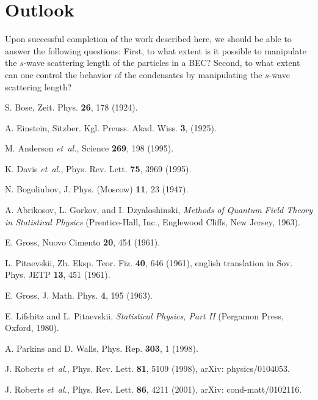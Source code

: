 \documentclass[%
   final       %
]{prospectus}
\begin{document}
\section*{Outlook}

Upon successful completion of the work described here, we
should be able to answer the following questions: First, to what extent is it
possible to manipulate the $s$-wave scattering length of the particles in a
BEC? Second, to what extent can one control the behavior of the condensates 
by manipulating the $s$-wave scattering length?

\begin{thebibliography}{10}

S. Bose, Zeit. Phys. {\bf 26},  178  (1924).

A. Einstein, Sitzber. Kgl. Preuss. Akad. Wiss. {\bf 3},    (1925).

M. Anderson {\it et~al.}, Science {\bf 269},  198  (1995).

K. Davis {\it et~al.}, Phys. Rev. Lett. {\bf 75},  3969  (1995).

N. Bogoliubov, J. Phys. (Moscow) {\bf 11},  23  (1947).

A. Abrikosov, L. Gorkov, and I. Dzyaloshinski, {\em Methods of Quantum Field
  Theory in Statistical Physics} (Prentice-Hall, Inc., Englewood Cliffs, New
  Jersey, 1963).

E. Gross, Nuovo Cimento {\bf 20},  454  (1961).

L. Pitaevskii, Zh. Eksp. Teor. Fiz. {\bf 40},  646  (1961), english translation
  in Sov. Phys. JETP {\bf 13}, 451 (1961).

E. Gross, J. Math. Phys. {\bf 4},  195  (1963).

E. Lifshitz and L. Pitaevskii, {\em Statistical Physics, Part II} (Pergamon
  Press, Oxford, 1980).

A. Parkins and D. Walls, Phys. Rep. {\bf 303},  1  (1998).

J. Roberts {\it et~al.}, Phys. Rev. Lett. {\bf 81},  5109  (1998), arXiv:
  physics/0104053.

J. Roberts {\it et~al.}, Phys. Rev. Lett. {\bf 86},  4211  (2001), arXiv:
  cond-matt/0102116.


\end{thebibliography}
\end{document}
